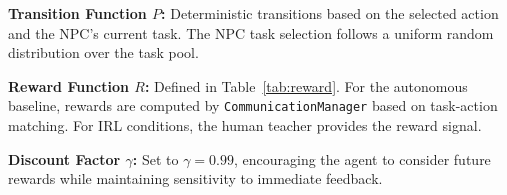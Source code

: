 \documentclass[../report.tex]{subfiles}
\begin{document}
    \textbf{Transition Function $P$:} Deterministic transitions based on the selected action and the NPC's current task. The NPC task selection follows a uniform random distribution over the task pool.

    \textbf{Reward Function $R$:} Defined in Table~\ref{tab:reward}. For the autonomous baseline, rewards are computed by \texttt{CommunicationManager} based on task-action matching. For IRL conditions, the human teacher provides the reward signal.

    \textbf{Discount Factor $\gamma$:} Set to $\gamma = 0.99$, encouraging the agent to consider future rewards while maintaining sensitivity to immediate feedback.
\end{document}
